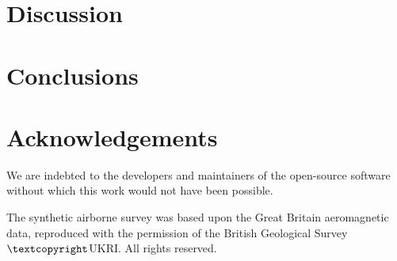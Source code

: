 \documentclass[twocolumn]{article}
\begin{document}

\section{Discussion}


\section{Conclusions}


\section{Acknowledgements}

We are indebted to the developers and maintainers of the open-source software
without which this work would not have been possible.

The synthetic airborne survey was based upon the Great Britain aeromagnetic
data, reproduced with the permission of the British Geological Survey
$\textcopyright$UKRI\@.
All rights reserved.




\end{document}
